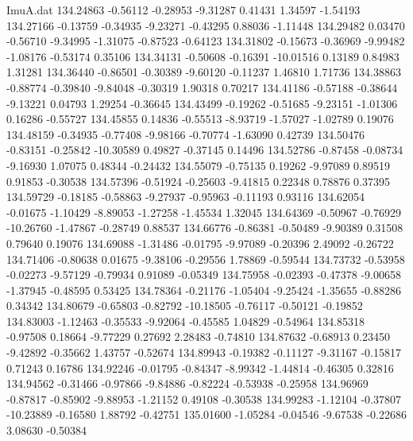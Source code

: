 \begin{filecontents}{ImuA.dat}
 134.24863   -0.56112   -0.28953   -9.31287    0.41431    1.34597   -1.54193
 134.27166   -0.13759   -0.34935   -9.23271   -0.43295    0.88036   -1.11448
 134.29482    0.03470   -0.56710   -9.34995   -1.31075   -0.87523   -0.64123
 134.31802   -0.15673   -0.36969   -9.99482   -1.08176   -0.53174    0.35106
 134.34131   -0.50608   -0.16391  -10.01516    0.13189    0.84983    1.31281
 134.36440   -0.86501   -0.30389   -9.60120   -0.11237    1.46810    1.71736
 134.38863   -0.88774   -0.39840   -9.84048   -0.30319    1.90318    0.70217
 134.41186   -0.57188   -0.38644   -9.13221    0.04793    1.29254   -0.36645
 134.43499   -0.19262   -0.51685   -9.23151   -1.01306    0.16286   -0.55727
 134.45855    0.14836   -0.55513   -8.93719   -1.57027   -1.02789    0.19076
 134.48159   -0.34935   -0.77408   -9.98166   -0.70774   -1.63090    0.42739
 134.50476   -0.83151   -0.25842  -10.30589    0.49827   -0.37145    0.14496
 134.52786   -0.87458   -0.08734   -9.16930    1.07075    0.48344   -0.24432
 134.55079   -0.75135    0.19262   -9.97089    0.89519    0.91853   -0.30538
 134.57396   -0.51924   -0.25603   -9.41815    0.22348    0.78876    0.37395
 134.59729   -0.18185   -0.58863   -9.27937   -0.95963   -0.11193    0.93116
 134.62054   -0.01675   -1.10429   -8.89053   -1.27258   -1.45534    1.32045
 134.64369   -0.50967   -0.76929  -10.26760   -1.47867   -0.28749    0.88537
 134.66776   -0.86381   -0.50489   -9.90389    0.31508    0.79640    0.19076
 134.69088   -1.31486   -0.01795   -9.97089   -0.20396    2.49092   -0.26722
 134.71406   -0.80638    0.01675   -9.38106   -0.29556    1.78869   -0.59544
 134.73732   -0.53958   -0.02273   -9.57129   -0.79934    0.91089   -0.05349
 134.75958   -0.02393   -0.47378   -9.00658   -1.37945   -0.48595    0.53425
 134.78364   -0.21176   -1.05404   -9.25424   -1.35655   -0.88286    0.34342
 134.80679   -0.65803   -0.82792  -10.18505   -0.76117   -0.50121   -0.19852
 134.83003   -1.12463   -0.35533   -9.92064   -0.45585    1.04829   -0.54964
 134.85318   -0.97508    0.18664   -9.77229    0.27692    2.28483   -0.74810
 134.87632   -0.68913    0.23450   -9.42892   -0.35662    1.43757   -0.52674
 134.89943   -0.19382   -0.11127   -9.31167   -0.15817    0.71243    0.16786
 134.92246   -0.01795   -0.84347   -8.99342   -1.44814   -0.46305    0.32816
 134.94562   -0.31466   -0.97866   -9.84886   -0.82224   -0.53938   -0.25958
 134.96969   -0.87817   -0.85902   -9.88953   -1.21152    0.49108   -0.30538
 134.99283   -1.12104   -0.37807  -10.23889   -0.16580    1.88792   -0.42751
 135.01600   -1.05284   -0.04546   -9.67538   -0.22686    3.08630   -0.50384

\end{filecontents}
